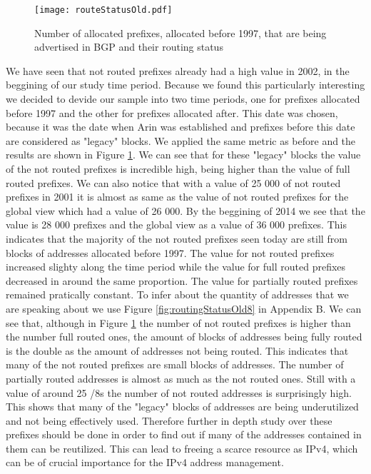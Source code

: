 \documentclass[11pt,a4paper]{scrreprt}
\begin{document}
\begin{figure}[!h]
\centering
\texttt{[image: routeStatusOld.pdf]}
\caption{Number of allocated prefixes, allocated before 1997, that are being advertised in BGP and their routing status}
\label{fig:routingStatusOld}
\end{figure}

We have seen that not routed prefixes already had a high value in 2002, in the beggining of our study time period. Because we found this particularly interesting we decided to devide our sample into two time periods, one for prefixes allocated before 1997 and the other for prefixes allocated after. This date was chosen, because it was the date when Arin was established and prefixes before this date are considered as "legacy" blocks. 
We applied the same metric as before and the results are shown in Figure \ref{fig:routingStatusOld}. We can see that for these "legacy" blocks the value of the not routed prefixes is incredible high, being higher than the value of full routed prefixes. We can also notice that with a value of 25 000 of not routed prefixes in 2001 it is almost as same as the value of not routed prefixes for the global view which had a value of 26 000. By the beggining of 2014 we see that the value is 28 000 prefixes and the global view as a value of 36 000 prefixes. This indicates that the majority of the not routed prefixes seen today are still from blocks of addresses allocated before 1997. The value for not routed prefixes increased slighty along the time period while the value for full routed prefixes decreased in around the same proportion. The value for partially routed prefixes remained pratically constant. 
To infer about the quantity of addresses that we are speaking about we use Figure \ref{fig:routingStatusOld8} in Appendix B. We can see that, although in Figure \ref{fig:routingStatusOld} the number of not routed prefixes is higher than the number full routed ones, the amount of blocks of addresses being fully routed is the double as the amount of addresses not being routed. This indicates that many of the not routed prefixes are small blocks of addresses. 
The number of partially routed addresses is almost as much as the not routed ones. Still with a value of around 25 /8s the number of not routed addresses is surprisingly high. This shows that many of the "legacy" blocks of addresses are being underutilized and not being effectively used. Therefore further in depth study over these prefixes should be done in order to find out if many of the addresses contained in them can be reutilized. This can lead to freeing a scarce resource as IPv4, which can be of crucial importance for the IPv4 address management.
\end{document}
